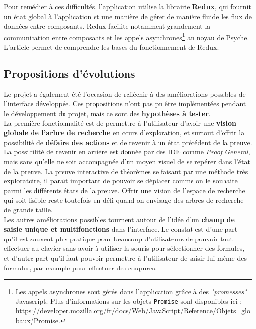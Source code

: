 Pour remédier à ces difficultés, l'application utilise la librairie \textbf{Redux}, qui fournit un état global à l'application et une manière de gérer de manière fluide les flux de données entre composants. Redux facilite notamment grandement la communication entre composants et les appels asynchrones\footnote{Les appels asynchrones sont gérés dans l'application grâce à des \textit{"promesses"} Javascript. Plus d'informations sur les objets \texttt{Promise} sont disponibles ici : \url{https://developer.mozilla.org/fr/docs/Web/JavaScript/Reference/Objets_globaux/Promise}.} au noyau de Psyche. L'article \cite{redux2016} permet de comprendre les bases du fonctionnement de Redux.

\subsection{Propositions d'évolutions}

Le projet a également été l'occasion de réfléchir à des améliorations possibles de l'interface développée. Ces propositions n'ont pas pu être implémentées pendant le développement du projet, mais ce sont des \textbf{hypothèses à tester}.\\

La première fonctionnalité est de permettre à l'utilisateur d'avoir une \textbf{vision globale de l'arbre de recherche} en cours d'exploration, et surtout d'offrir la possibilité de \textbf{défaire des actions} et de revenir à un état précédent de la preuve. La possibilité de revenir en arrière est donnée par des IDE comme \textit{Proof General}, mais sans qu'elle ne soit accompagnée d'un moyen visuel de se repérer dans l'état de la preuve. La preuve interactive de théorèmes se faisant par une méthode très exploratoire, il paraît important de pouvoir se déplacer comme on le souhaite parmi les différents états de la preuve. Offrir une vision de l'espace de recherche qui soit lisible reste toutefois un défi quand on envisage des arbres de recherche de grande taille.\\

Les autres améliorations possibles tournent autour de l'idée d'un \textbf{champ de saisie unique et multifonctions} dans l'interface. Le constat est d'une part qu'il est souvent plus pratique pour beaucoup d'utilisateurs de pouvoir tout effectuer au clavier sans avoir à utiliser la souris pour sélectionner des formules, et d'autre part qu'il faut pouvoir permettre à l'utilisateur de saisir lui-même des formules, par exemple pour effectuer des coupures.\\

